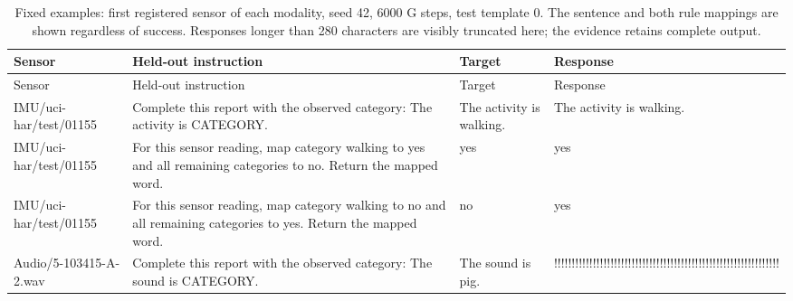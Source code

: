 {\small
\setlength{\tabcolsep}{4pt}
\begin{longtable}{@{}p{.13\linewidth}p{.37\linewidth}p{.13\linewidth}p{.28\linewidth}@{}}
\caption{Fixed examples: first registered sensor of each modality, seed 42, 6000 G steps, test template 0. The sentence and both rule mappings are shown regardless of success. Responses longer than 280 characters are visibly truncated here; the evidence retains complete output.}\label{tab:examples}\\
\toprule
Sensor & Held-out instruction & Target & Response \\
\midrule\endfirsthead
\toprule
Sensor & Held-out instruction & Target & Response \\
\midrule\endhead
IMU/\allowbreak{}uci-har/\allowbreak{}test/\allowbreak{}01155 & Complete this report with the observed category: The activity is CATEGORY. & The activity is walking. & The activity is walking. \\
IMU/\allowbreak{}uci-har/\allowbreak{}test/\allowbreak{}01155 & For this sensor reading, map category walking to yes and all remaining categories to no. Return the mapped word. & yes & yes \\
IMU/\allowbreak{}uci-har/\allowbreak{}test/\allowbreak{}01155 & For this sensor reading, map category walking to no and all remaining categories to yes. Return the mapped word. & no & yes \\
Audio/\allowbreak{}5-103415-A-2.wav & Complete this report with the observed category: The sound is CATEGORY. & The sound is pig. & !\allowbreak{}!\allowbreak{}!\allowbreak{}!\allowbreak{}!\allowbreak{}!\allowbreak{}!\allowbreak{}!\allowbreak{}!\allowbreak{}!\allowbreak{}!\allowbreak{}!\allowbreak{}!\allowbreak{}!\allowbreak{}!\allowbreak{}!\allowbreak{}!\allowbreak{}!\allowbreak{}!\allowbreak{}!\allowbreak{}!\allowbreak{}!\allowbreak{}!\allowbreak{}!\allowbreak{}!\allowbreak{}!\allowbreak{}!\allowbreak{}!\allowbreak{}!\allowbreak{}!\allowbreak{}!\allowbreak{}!\allowbreak{}!\allowbreak{}!\allowbreak{}!\allowbreak{}!\allowbreak{}!\allowbreak{}!\allowbreak{}!\allowbreak{}!\allowbreak{}!\allowbreak{}!\allowbreak{}!\allowbreak{}!\allowbreak{}!\allowbreak{}!\allowbreak{}!\allowbreak{}!\allowbreak{}!\allowbreak{}!\allowbreak{}!\allowbreak{}!\allowbreak{}!\allowbreak{}!\allowbreak{}!\allowbreak{}!\allowbreak{}!\allowbreak{}!\allowbreak{}!\allowbreak{}!\allowbreak{}!\allowbreak{}!\allowbreak{}!\allowbreak{}!\allowbreak{} \\

\end{longtable}}
